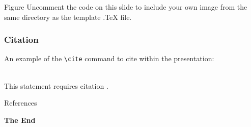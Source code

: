 \documentclass[aspectratio=169,xcolor=dvipsnames]{beamer}
\begin{document}

\begin{frame}{Figure}
    Uncomment the code on this slide to include your own image from the same directory as the template .TeX file.
\end{frame}


\begin{frame}[fragile] %
    \frametitle{Citation}
    An example of the \verb|\cite| command to cite within the presentation:\\~

    This statement requires citation \cite{p1}.
\end{frame}


\begin{frame}{References}
    \footnotesize
    
    
\end{frame}


\begin{frame}
    \Huge{\centerline{\textbf{The End}}}
\end{frame}

\end{document}

